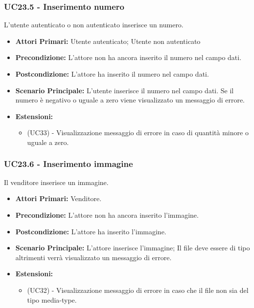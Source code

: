\subsubsection{UC23.5 - Inserimento numero} 
\label{UC23.5}
L'utente autenticato o non autenticato inserisce un numero.
\begin{itemize}
    \item \textbf{Attori Primari:} Utente autenticato; Utente non autenticato
    \item \textbf{Precondizione:} L'attore non ha ancora inserito il numero nel campo dati.
    \item \textbf{Postcondizione:} L'attore ha inserito il numero nel campo dati.
    \item \textbf{Scenario Principale:} L'utente inserisce il numero nel campo dati. Se il numero è negativo o uguale a zero viene visualizzato un messaggio di errore.
    \item \textbf{Estensioni:}
    \begin{itemize}
        \item (UC33) - Visualizzazione messaggio di errore in caso di quantità minore o uguale a zero.
    \end{itemize}
\end{itemize}

\subsubsection{UC23.6 - Inserimento immagine} 
\label{UC23.6}
Il venditore inserisce un immagine.
\begin{itemize}
    \item \textbf{Attori Primari:} Venditore.
    \item \textbf{Precondizione:} L'attore non ha ancora inserito l'immagine.
    \item \textbf{Postcondizione:} L'attore ha inserito l'immagine.
    \item \textbf{Scenario Principale:} L'attore inserisce l'immagine; Il file deve essere di tipo  altrimenti verrà visualizzato un messaggio di errore.
    \item \textbf{Estensioni:}
    \begin{itemize}
        \item (UC32) - Visualizzazione messaggio di errore in caso che il file non sia del tipo media-type.
    \end{itemize}
\end{itemize}

